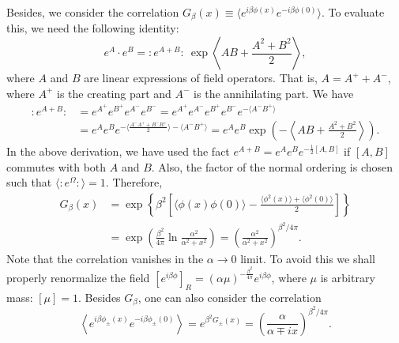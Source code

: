 \documentclass{SciPost}
\newcommand{\normord}[1]{{:\mathrel{#1}:}}
\begin{document}
Besides, we consider the correlation $G_\beta(x)\equiv\langle e^{i\beta\phi(x)} e^{-i\beta\phi(0)}\rangle$.
To evaluate this, we need the following identity:
\begin{equation}\label{eq:normord-id}
	e^A \cdot e^B = \normord{e^{A+B}} \ \exp\left\langle AB+\frac{A^2+B^2}{2}\right\rangle,
\end{equation}
where $A$ and $B$ are linear expressions of field operators.
That is, $A = A^+ + A^-$, where $A^+$ is the creating part and $A^-$ is the annihilating part.
We have
\begin{equation*}
\begin{aligned}
	\normord{e^{A+B}} &= e^{A^+} e^{B^+} e^{A^-} e^{B^-}
	= e^{A^+} e^{A^-} e^{B^+} e^{B^-} e^{-\langle A^- B^+\rangle} \\
	&= e^{A} e^{B} e^{-\langle\frac{A^-A^++B^-B^+}{2}\rangle-\langle A^- B^+\rangle}
	= e^{A} e^{B} \exp\left(-\left\langle AB+\frac{A^2+B^2}{2}\right\rangle\right).
\end{aligned}
\end{equation*}
In the above derivation, we have used the fact $e^{A+B}=e^A e^B e^{-\frac{1}{2}[A,B]}$ if $[A,B]$ commutes with both $A$ and $B$.
Also, the factor of the normal ordering is chosen such that $\langle\normord{e^{\Omega}}\rangle=1$.
Therefore,
\begin{equation}
\begin{aligned}
	G_\beta(x) &= \exp\left\{\beta^2\left[\langle\phi(x)\phi(0)\rangle-\frac{\langle\phi^2(x)\rangle+\langle\phi^2(0)\rangle}{2}\right]\right\} \\
	&= \exp\left(\frac{\beta^2}{4\pi}\ln\frac{\alpha^2}{\alpha^2+x^2}\right)
	= \left(\frac{\alpha^2}{\alpha^2+x^2}\right)^{\beta^2/4\pi}.
\end{aligned}
\end{equation} 
Note that the correlation vanishes in the $\alpha \rightarrow 0$ limit.
To avoid this we shall properly renormalize the field $\left[e^{i\beta \phi}\right]_R = (\alpha\mu)^{-\frac{\beta^2}{4\pi}} e^{i\beta\phi}$, where $\mu$ is arbitrary mass: $[\mu]=1$.
Besides $G_\beta$, one can also consider the correlation
\begin{equation*}
	\left\langle e^{i\beta\phi_\pm(x)} e^{-i\beta\phi_\pm(0)} \right\rangle
	= e^{\beta^2 G_\pm(x)} = \left(\frac{\alpha}{\alpha\mp ix}\right)^{\beta^2/4\pi}.
\end{equation*}
\end{document}
